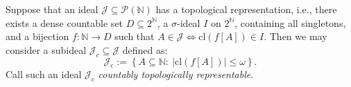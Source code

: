 \documentclass{amsart}
\theoremstyle{definition}
\theoremstyle{definition}
\newcommand{\N}{{\mathbb N}}
\newcommand{\R}{{\mathbb R}}
\newcommand{\Q}{{\mathbb Q}}
\newcommand{\I}{\mathcal I}
\newcommand{\J}{\mathcal J}
\newcommand{\calF}{\mathcal{F}}
\newcommand{\calI}{\mathcal{I}}
\newcommand{\Seg}{\mathrm{Seg}}
\newcommand{\NULL}{\mathrm{NULL}}
\newcommand{\INULL}{\calI_\mathrm{NULL}}
\newcommand{\cl}{\mathrm{cl}}
\newcommand{\interior}{\mathrm{int}}
\newcommand{\negligible}{\mathcal{N}}
\begin{document}


Suppose that an ideal $\mathcal{J}\subseteq \mathcal{P}(\N)$ has a topological representation, i.e., there exists a dense countable set $D\subseteq 2^{\N}$, a $\sigma$-ideal $I$ on $2^{\N}$, containing all singletons, and a bijection $f\colon\N\to D$ such that $A\in\J \Leftrightarrow \cl(f[A])\in I$. Then we may consider a subideal $\J_c \subseteq \J$ defined as:
$$\J_c :=\left\{A\subseteq \N :\ |\cl(f[A])| \leq \omega\right\}.$$
Call such an ideal $\J_c$ \emph{countably topologically representable}.
\end{document}
